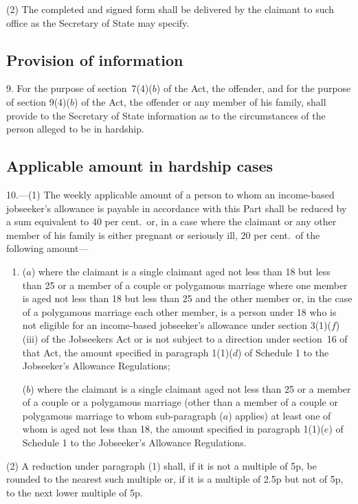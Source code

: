 \documentclass[12pt,a4paper]{article}
\begin{document}
(2) The completed and signed form shall be delivered by the claimant to such office as the Secretary of State may specify.

\subsection[9. Provision of information]{Provision of information}

9.  For the purpose of section~7(4)($b$)  of the Act, the offender, and for the purpose of section 9(4)($b$)  of the Act, the offender or any member of his family, shall provide to the Secretary of State information as to the circumstances of the person alleged to be in hardship.

\subsection[10. Applicable amount in hardship cases]{Applicable amount in hardship cases}

10.---(1)  The weekly applicable amount of a person to whom an income-based jobseeker’s allowance is payable in accordance with this Part shall be reduced by a sum equivalent to 40 per cent.\ or, in a case where the claimant or any other member of his family is either pregnant or seriously ill, 20 per cent.\ of the following amount—
\begin{enumerate}\item[]
($a$) where the claimant is a single claimant aged not less than 18 but less than 25 or a member of a couple or polygamous marriage where one member is aged not less than 18 but less than 25 and the other member or, in the case of a polygamous marriage each other member, is a person under 18 who is not eligible for an income-based jobseeker’s allowance under section 3(1)($f$)(iii)  of the Jobseekers Act or is not subject to a direction under section~16 of that Act, the amount specified in paragraph 1(1)($d$)  of Schedule 1 to the Jobseeker’s Allowance Regulations;

($b$) where the claimant is a single claimant aged not less than 25 or a member of a couple or a polygamous marriage (other than a member of a couple or polygamous marriage to whom sub-paragraph ($a$)  applies) at least one of whom is aged not less than 18, the amount specified in paragraph 1(1)($e$)  of Schedule 1 to the Jobseeker’s Allowance Regulations.
\end{enumerate}

(2) A reduction under paragraph (1) shall, if it is not a multiple of 5p, be rounded to the nearest such multiple or, if it is a multiple of 2$.$5p but not of 5p, to the next lower multiple of 5p.
\end{document}
